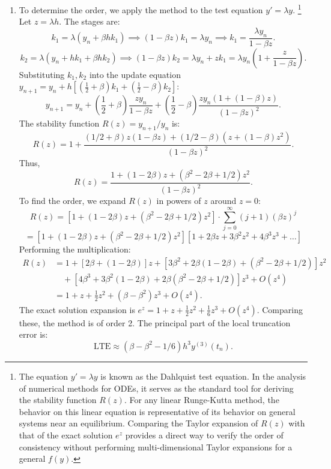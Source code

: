 \begin{solution}
\begin{enumerate}
\item[(a)] To determine the order, we apply the method to the test equation $y' = \lambda y$. \footnote{The equation $y' = \lambda y$ is known as the Dahlquist test equation. In the analysis of numerical methods for ODEs, it serves as the standard tool for deriving the stability function $R(z)$. For any linear Runge-Kutta method, the behavior on this linear equation is representative of its behavior on general systems near an equilibrium. Comparing the Taylor expansion of $R(z)$ with that of the exact solution $e^z$ provides a direct way to verify the order of consistency without performing multi-dimensional Taylor expansions for a general $f(y)$.} Let $z = \lambda h$. The stages are:
\[
k_1 = \lambda (y_n + \beta h k_1) \implies (1 - \beta z) k_1 = \lambda y_n \implies k_1 = \frac{\lambda y_n}{1 - \beta z}.
\]
\[
k_2 = \lambda (y_n + h k_1 + \beta h k_2) \implies (1 - \beta z) k_2 = \lambda y_n + z k_1 = \lambda y_n \left( 1 + \frac{z}{1 - \beta z} \right).
\]
Substituting $k_1, k_2$ into the update equation $y_{n+1} = y_n + h\left[ \left(\frac{1}{2} + \beta\right) k_1 + \left(\frac{1}{2} - \beta\right) k_2 \right]$:
\[
y_{n+1} = y_n + \left(\frac{1}{2} + \beta\right) \frac{z y_n}{1 - \beta z} + \left(\frac{1}{2} - \beta\right) \frac{z y_n (1 + (1-\beta)z)}{(1 - \beta z)^2}.
\]
The stability function $R(z) = y_{n+1}/y_n$ is:
\[
R(z) = 1 + \frac{(1/2 + \beta) z (1 - \beta z) + (1/2 - \beta) (z + (1-\beta)z^2)}{(1 - \beta z)^2}.
\]
Thus,
\[
R(z) = \frac{1 + (1-2\beta) z + (\beta^2 - 2\beta + 1/2) z^2}{(1 - \beta z)^2}.
\]
To find the order, we expand $R(z)$ in powers of $z$ around $z=0$:
\[
R(z) = [1 + (1-2\beta) z + (\beta^2 - 2\beta + 1/2) z^2] \cdot \sum_{j=0}^{\infty} (j+1) (\beta z)^j
\]
\[
= [1 + (1-2\beta) z + (\beta^2 - 2\beta + 1/2) z^2] [1 + 2\beta z + 3\beta^2 z^2 + 4\beta^3 z^3 + \dots]
\]
Performing the multiplication:
\begin{align*}
R(z) &= 1 + [2\beta + (1-2\beta)]z + [3\beta^2 + 2\beta(1-2\beta) + (\beta^2 - 2\beta + 1/2)]z^2 \\
&\quad + [4\beta^3 + 3\beta^2(1-2\beta) + 2\beta(\beta^2 - 2\beta + 1/2)]z^3 + O(z^4) \\
&= 1 + z + \frac{1}{2} z^2 + (\beta - \beta^2) z^3 + O(z^4).
\end{align*}
The exact solution expansion is $e^z = 1 + z + \frac{1}{2}z^2 + \frac{1}{6}z^3 + O(z^4)$. Comparing these, the method is of order 2. The principal part of the local truncation error is:
\[
\text{LTE} \approx (\beta - \beta^2 - 1/6) h^3 y^{(3)}(t_n).
\]


\end{enumerate}
\end{solution}
